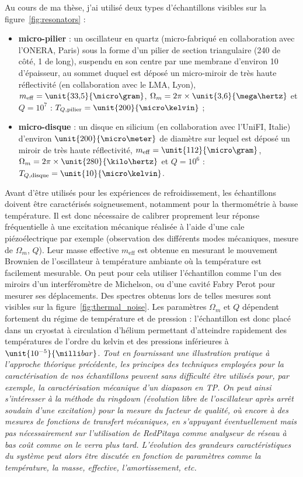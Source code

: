 \documentclass[12pt,a4paper]{article}
\begin{document}
Au cours de ma thèse, j'ai utilisé deux types d'échantillons visibles sur la figure~\ref{fig:resonators} :
\begin{itemize}
\item \textbf{micro-pilier} : un oscillateur en quartz (micro-fabriqué en collaboration avec l'ONERA, Paris) sous la forme d'un pilier de section triangulaire (\unit{240}{\micro\meter} de côté, \unit{1}{\milli\meter} de long), suspendu en son centre par une membrane d'environ \unit{10}{\micro\meter} d'épaisseur, au sommet duquel est déposé un micro-miroir de très haute réflectivité (en collaboration avec le LMA, Lyon), $m_\mathrm{eff}=\unit{33{,}5}{\micro\gram}$, $\Omega_m=2\pi\times\unit{3{,}6}{\mega\hertz}$ et $Q=10^7$ : $T_{Q,\mathrm{pilier}} = \unit{200}{\micro\kelvin}$ ;
\item \textbf{micro-disque} : un disque en silicium (en collaboration avec l'UniFI, Italie) d'environ $\unit{200}{\micro\meter}$ de diamètre sur lequel est déposé un miroir de très haute réflectivité, $m_\mathrm{eff}=\unit{112}{\micro\gram}$, $\Omega_m=2\pi\times\unit{280}{\kilo\hertz}$ et $Q=10^6$ : $T_{Q,\mathrm{disque}} = \unit{10}{\micro\kelvin}$.
\end{itemize}
Avant d'être utilisés pour les expériences de refroidissement, les échantillons doivent être caractérisés soigneusement, notamment pour la thermométrie à basse température.
Il est donc nécessaire de calibrer proprement leur réponse fréquentielle à une excitation mécanique réalisée à l'aide d'une cale piézoélectrique par exemple (observation des différents modes mécaniques, mesure de $\Omega_m$, $Q$).
Leur masse effective $m_\mathrm{eff}$ est obtenue en mesurant le mouvement Brownien de l'oscillateur à température ambiante où la température est facilement mesurable.
On peut pour cela utiliser l'échantillon comme l'un des miroirs d'un interféromètre de Michelson, ou d'une cavité Fabry Perot pour mesurer ses déplacements.
Des spectres obtenus lors de telles mesures sont visibles sur la figure~\ref{fig:thermal_noise}.
Les paramètres $\Omega_m$ et $Q$ dépendent fortement du régime de température et de pression  : l'échantillon est donc placé dans un cryostat à circulation d'hélium permettant d'atteindre rapidement des températures de l'ordre du kelvin et des pressions inférieures à $\unit{10^{-5}}{\milli bar}$.
\emph{Tout en fournissant une illustration pratique à l'approche théorique précédente, les principes des techniques employées pour la caractérisation de nos échantillons peuvent sans difficulté être utilisés pour, par exemple, la caractérisation mécanique d'un diapason en TP.
On peut ainsi s'intéresser à la méthode du ringdown (évolution libre de l'oscillateur après arrêt soudain d'une excitation) pour la mesure du facteur de qualité, où encore à des mesures de fonctions de transfert mécaniques, en s'appuyant éventuellement mais pas nécessairement sur l'utilisation de RedPitaya comme analyseur de réseau à bas coût comme on le verra plus tard.
L'évolution des grandeurs caractéristiques du système peut alors être discutée en fonction de paramètres comme la température, la masse, effective, l'amortissement, etc.}
\end{document}
